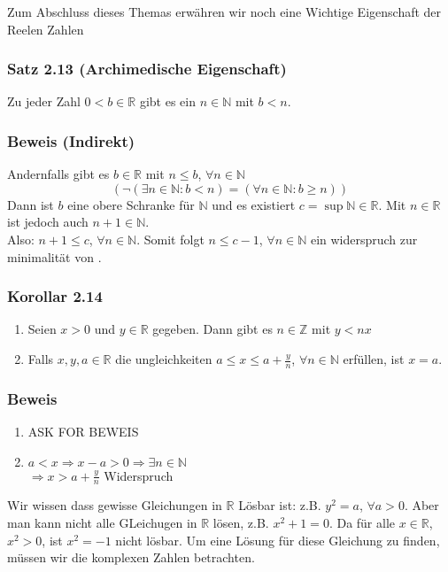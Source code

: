Zum Abschluss dieses Themas erwähren wir noch eine Wichtige Eigenschaft der Reelen Zahlen

\subsubsection*{Satz 2.13 (Archimedische Eigenschaft)}
Zu jeder Zahl $0<b\in\mathbb{R}$ gibt es ein $n\in\mathbb{N}$ mit $b<n$.
\subsubsection*{Beweis (Indirekt)}
Andernfalls gibt es $b\in\mathbb{R}$ mit $n\leq b$, $\forall n\in\mathbb{N}$ $$\left( \lnot\left(\exists n\in\mathbb{N}:b<n\right)=\left(\forall n\in\mathbb{N}:b\geq n\right)\right)$$
Dann ist $b$ eine obere Schranke für $\mathbb{N}$ und es existiert $c=\sup\mathbb{N}\in\mathbb{R}$. Mit $n\in\mathbb{R}$ ist jedoch auch $n+1\in\mathbb{N}$.\\
Also: $n+1\leq c$, $\forall n\in\mathbb{N}$. Somit folgt $n\leq c-1$, $\forall n\in\mathbb{N}$ ein widerspruch zur minimalität von .

\subsubsection*{Korollar 2.14}
\begin{enumerate}
    \item Seien $x>0$ und $y\in\mathbb{R}$ gegeben. Dann gibt es $n\in\mathbb{Z}$ mit $y<nx$
    \item Falls $x,y,a\in\mathbb{R}$ die ungleichkeiten $a\leq x\leq a+\frac{y}{n}$, $\forall n\in\mathbb{N}$ erfüllen, ist $x=a$.
\end{enumerate}
\subsubsection*{Beweis}

\begin{enumerate}
    \item ASK FOR BEWEIS
    \item $a<x\Rightarrow x-a>0\Rightarrow \exists n\in\mathbb{N}$\\
$\Rightarrow x>a+\frac{y}{n}$ Widerspruch
\end{enumerate}
Wir wissen dass gewisse Gleichungen in $\mathbb{R}$ Lösbar ist: z.B. $y^2=a$, $\forall a>0$. Aber man kann nicht alle GLeichugen in $\mathbb{R}$ lösen, z.B. $x^2+1=0$. Da für alle $x\in\mathbb{R}$, $x^2>0$, ist $x^2=-1$ nicht lösbar. Um eine Lösung für diese Gleichung zu finden, müssen wir die komplexen Zahlen betrachten.\\

